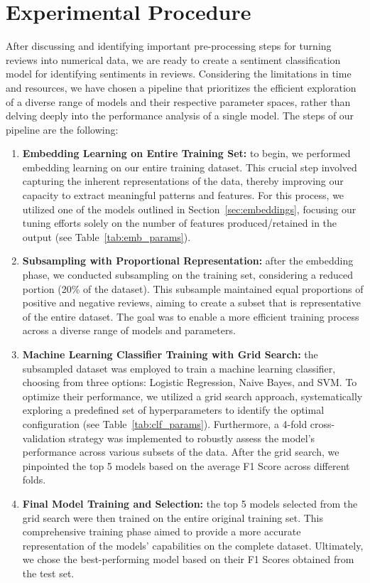 \section{Experimental Procedure}


After discussing and identifying important pre-processing steps for turning reviews into numerical data, we are ready to create a sentiment classification model for identifying sentiments in reviews.
Considering the limitations in time and resources, we have chosen a pipeline that prioritizes the efficient exploration of a diverse range of models and their respective parameter spaces, rather than delving deeply into the performance analysis of a single model.
The steps of our pipeline are the following:


\begin{enumerate}
    \item \textbf{Embedding Learning on Entire Training Set:} to begin, we performed embedding learning on our entire training dataset. This crucial step involved capturing the inherent representations of the data, thereby improving our capacity to extract meaningful patterns and features. For this process, we utilized one of the models outlined in Section~\ref{sec:embeddings}, focusing our tuning efforts solely on the number of features produced/retained in the output (see Table~\ref{tab:emb_params}).


    \item \textbf{Subsampling with Proportional Representation:} after the embedding phase, we conducted subsampling on the training set, considering a reduced portion (20\% of the dataset). This subsample maintained equal proportions of positive and negative reviews, aiming to create a subset that is representative of the entire dataset. The goal was to enable a more efficient training process across a diverse range of models and parameters.
        
    \item \textbf{Machine Learning Classifier Training with Grid Search:} the subsampled dataset was employed to train a machine learning classifier, choosing from three options: Logistic Regression, Naive Bayes, and SVM. To optimize their performance, we utilized a grid search approach, systematically exploring a predefined set of hyperparameters to identify the optimal configuration (see Table~\ref{tab:clf_params}). Furthermore, a 4-fold cross-validation strategy was implemented to robustly assess the model's performance across various subsets of the data. After the grid search, we pinpointed the top 5 models based on the average F1 Score across different folds. 

    \item \textbf{Final Model Training and Selection:} the top 5 models selected from the grid search were then trained on the entire original training set. This comprehensive training phase aimed to provide a more accurate representation of the models' capabilities on the complete dataset. Ultimately, we chose the best-performing model based on their F1 Scores obtained from the test set.

\end{enumerate}

